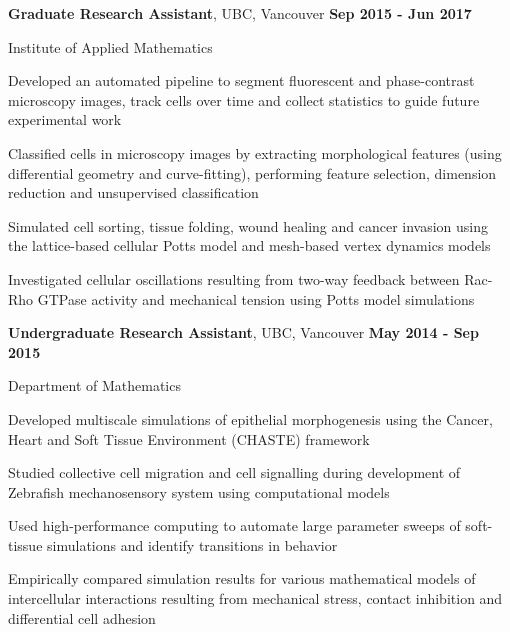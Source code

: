 \documentclass[margin,line]{res}
\newenvironment{list1}{
  \begin{list}{\ding{113}}{
      \setlength{\itemsep}{0in}
      \setlength{\parsep}{0in} \setlength{\parskip}{0in}
      \setlength{\topsep}{0in} \setlength{\partopsep}{0in}
      \setlength{\leftmargin}{0.17in}}}{\end{list}}
\newenvironment{list3}{
  \begin{list}{\textopenbullet}{
      \setlength{\itemsep}{0in}
      \setlength{\parsep}{0in} \setlength{\parskip}{0in}
      \setlength{\topsep}{0in} \setlength{\partopsep}{0in}
      \setlength{\leftmargin}{0.1in}}}{\end{list}}
\begin{document}
\begin{resume}
{\bf Graduate Research Assistant}, UBC, Vancouver \hfill {\bf Sep 2015 - Jun 2017}\\
\vspace*{-.2cm}
\begin{list1}
\item[] Institute of Applied Mathematics
\vspace*{.2cm}
\begin{list3}
\setlength\itemsep{0.5em}
\item Developed an automated pipeline to segment fluorescent and phase-contrast microscopy images, track cells over time and collect statistics to guide future experimental work
\item Classified cells in microscopy images by extracting morphological features (using differential geometry and curve-fitting), performing feature selection, dimension reduction and unsupervised classification
\item Simulated cell sorting, tissue folding, wound healing and cancer invasion using the lattice-based cellular Potts model and mesh-based vertex dynamics models 
\item Investigated cellular oscillations resulting from two-way feedback between Rac-Rho GTPase activity and mechanical tension using Potts model simulations
\end{list3}
\end{list1}

{\bf Undergraduate Research Assistant}, UBC, Vancouver \hfill {\bf May 2014 - Sep 2015}\\
\vspace*{-.2cm}
\begin{list1}
\item[] Department of Mathematics
\vspace*{.2cm}
\begin{list3}
\setlength\itemsep{0.5em}
\item Developed multiscale simulations of epithelial morphogenesis using the Cancer, Heart and Soft Tissue Environment (CHASTE) framework
\item Studied collective cell migration and cell signalling during development of Zebrafish mechanosensory system using computational models
\item Used high-performance computing to automate large parameter sweeps of soft-tissue simulations and identify transitions in behavior
\item Empirically compared simulation results for various mathematical models of intercellular interactions resulting from mechanical stress, contact inhibition and differential cell adhesion
\end{list3}
\end{list1}
\vspace*{.2cm}


\end{resume}
\end{document}
